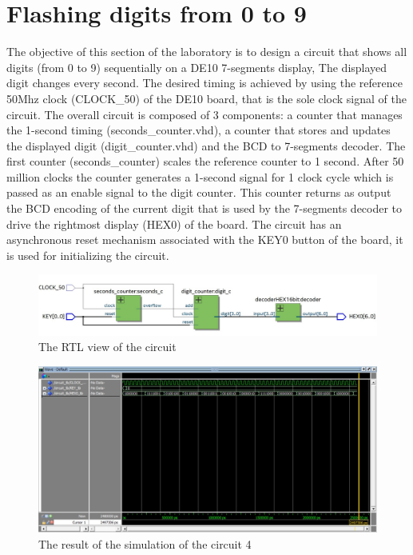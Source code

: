 \documentclass[12pt]{article}
\begin{document}
\section{Flashing digits from 0 to 9}
The objective of this section of the laboratory is to design a circuit that shows all digits (from 0 to 9) sequentially on a DE10 7-segments display, The displayed digit changes every second. The desired timing is achieved by using the reference 50Mhz clock (CLOCK\_50) of the DE10 board, that is the sole clock signal of the circuit. \newline
The overall circuit is composed of 3 components: a counter that manages the 1-second timing (seconds\_counter.vhd), a counter that stores and updates the displayed digit (digit\_counter.vhd) and the BCD to 7-segments decoder.\newline
The first counter (seconds\_counter) scales the reference counter to 1 second. After 50 million clocks the counter generates a 1-second signal for 1 clock cycle which is passed as an enable signal to the digit counter.
This counter returns as output the BCD encoding of the current digit that is used by the 7-segments decoder to drive the rightmost display (HEX0) of the board.\newline
The circuit has an asynchronous reset mechanism associated with the KEY0 button of the board, it is used for initializing the circuit.
\begin{figure}[h]
	\centering
	\includegraphics[scale = 0.5]{immagini/RTL4_4.jpg}
	\caption{The RTL view of the circuit}
\end{figure}
\begin{figure}[h]
\centering
\includegraphics[scale = 0.45]{immagini/Testbench.jpg}
\caption{The result of the simulation of the circuit 4}
\end{figure}
\end{document}
